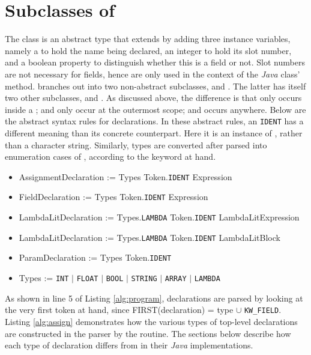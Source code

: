\section{Subclasses of }

The class  is an abstract type that extends  by adding three instance variables, namely a  to hold the name being declared, an integer to hold its slot number, and a boolean property to distinguish whether this is a field or not. Slot numbers are not necessary for fields, hence are only used in the context of the \emph{Java} class'  method.  branches out into two non-abstract subclasses,  and . The latter has itself two other subclasses,  and . As discussed above, the difference is that  only occurs inside a ;  and  only occur at the outermost scope; and  occurs anywhere. Below are the abstract syntax rules for declarations. In these abstract rules, an \texttt{IDENT} has a different meaning than its concrete counterpart. Here it is an instance of , rather than a character string. Similarly, types are converted after parsed into enumeration cases of , according to the keyword at hand.

\begin{itemize}
	\item AssignmentDeclaration := Types Token.\texttt{IDENT} Expression
	\item FieldDeclaration := Types Token.\texttt{IDENT} Expression
	\item LambdaLitDeclaration := Types.\texttt{LAMBDA} Token.\texttt{IDENT} LambdaLitExpression
	\item LambdaLitDeclaration := Types.\texttt{LAMBDA} Token.\texttt{IDENT} LambdaLitBlock
	\item ParamDeclaration := Types Token.\texttt{IDENT}
	\item Types := \texttt{INT} $|$ \texttt{FLOAT} $|$ \texttt{BOOL} $|$ \texttt{STRING} $|$ \texttt{ARRAY} $|$ \texttt{LAMBDA}
\end{itemize}

As shown in line 5 of Listing \ref{alg:program}, declarations are parsed by looking at the very first token at hand, since FIRST(declaration) = type $\cup$ \texttt{KW\_FIELD}. Listing \ref{alg:assign} demonstrates how the various types of top-level declarations are constructed in the parser by the  routine. The sections below describe how each type of declaration differs from  in their \emph{Java} implementations.

